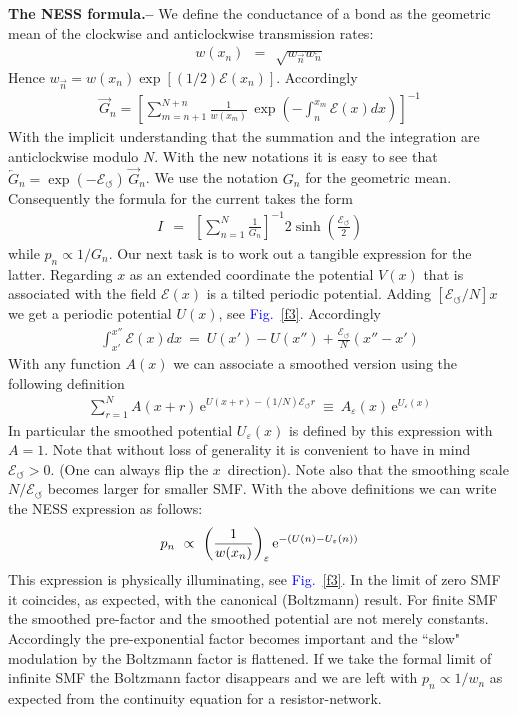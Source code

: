 \documentclass[aps,prl,floats,floatfix,twocolumn]{revtex4}
\newcommand{\eexp}{\mbox{e}^}
\newcommand{\mylabel}[1]{\label{#1}}
\newcommand{\beq}{\begin{eqnarray}}
\newcommand{\eeq}{\end{eqnarray}}
\newcommand{\be}[1]{\begin{eqnarray}\ifthenelse{#1=-1}
{\nonumber}{\ifthenelse{#1=0}{}{\mylabel{e#1}}}}
\newcommand{\sect}[1]{{\bf #1.-- }}
\newcommand{\Fig}[1]{\textcolor{blue}{Fig.}\!\!~\ref{#1}}
\begin{document}
\sect{The NESS formula}
%
%
We define the conductance of a bond as the geometric mean 
of the clockwise and anticlockwise transmission rates: 
%
\beq  
w(x_n) \ \ = \ \ \sqrt{ w_{\overrightarrow{n}} w_{\overleftarrow{n}} }
\eeq
%
Hence $w_{\overrightarrow{n}} = w(x_n) \exp[(1/2)\mathcal{E}(x_n)]$.
Accordingly 
%
%
\beq
\overrightarrow{G}_n = \left[ \sum_{m=n+1}^{N+n} \frac{1}{w(x_m)} 
\,\exp\left(-\int_{n}^{x_m} \!\!\!\mathcal{E}(x)dx \right) \right]^{-1} 
\eeq
%
With the implicit understanding that the summation and the integration 
are anticlockwise modulo $N$. With the new notations it is easy to see 
that ${\overleftarrow{G}_n = \exp(-\mathcal{E}_{\circlearrowleft}) \, \overrightarrow{G}_n}$.
We use the notation $G_n$ for the geometric mean. Consequently 
the formula for the current takes the form 
%
\beq
I \ \ = \ \ \left[\sum_{n=1}^N \frac{1}{G_n}\right]^{-1} 2\sinh\left(\frac{\mathcal{E}_{\circlearrowleft}}{2}\right)
\eeq 
%
while $p_n\propto 1/G_n$. Our next task is to work out a tangible 
expression for the latter. Regarding $x$ as an extended coordinate 
the potential $V(x)$ that is associated with the field $\mathcal{E}(x)$ 
is a tilted periodic potential. Adding $[\mathcal{E}_{\circlearrowleft}/N] x$
we get a periodic potential $U(x)$, see \Fig{f3}. Accordingly 
%
\beq
\int_{x'}^{x''} \!\!\!\mathcal{E}(x)dx \ = \ U(x'){-}U(x'') + \frac{\mathcal{E}_{\circlearrowleft}}{N}(x''{-}x')
\eeq  
%
With any function $A(x)$ we can associate a smoothed version 
using the following definition  
%
\beq
\sum_{r=1}^N A(x{+}r) \, \eexp{U(x{+}r)- (1/N)\mathcal{E}_{\circlearrowleft}r} \ \equiv \ A_{\varepsilon}(x) \, \eexp{U_{\varepsilon}(x)} 
\eeq
%
In particular the smoothed potential $U_{\varepsilon}(x)$ is defined by this expression with ${A=1}$. 
Note that without loss of generality it is convenient to have 
in mind ${\mathcal{E}_{\circlearrowleft}>0}$. (One can always flip the $x$~direction).  
Note also that the smoothing scale $N/\mathcal{E}_{\circlearrowleft}$ becomes larger for smaller SMF.
With the above definitions we can write the NESS expression as follows:
%
\be{17}
p_n \ \propto \ \left( \frac{1}{w(x_n)} \right)_{\varepsilon} \eexp{-(U(n)-U_{\varepsilon}(n))}
\eeq
%
This expression is physically illuminating, see \Fig{f3}. 
In the limit of zero SMF it coincides, as expected, 
with the canonical (Boltzmann) result. 
For finite SMF the smoothed pre-factor and the smoothed potential
are not merely constants. Accordingly the pre-exponential factor
becomes important and the ``slow" modulation by the Boltzmann factor 
is flattened. If we take the formal limit of infinite SMF 
the Boltzmann factor disappears and we are left with ${p_n \propto 1/w_n}$    
as expected from the continuity equation for a resistor-network. 
\end{document}
